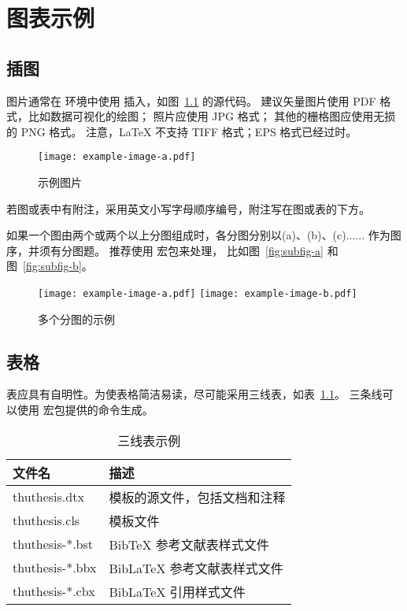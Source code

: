 
\chapter{图表示例}

\section{插图}

图片通常在  环境中使用  插入，如图~\ref{fig:example} 的源代码。
建议矢量图片使用 PDF 格式，比如数据可视化的绘图；
照片应使用 JPG 格式；
其他的栅格图应使用无损的 PNG 格式。
注意，LaTeX 不支持 TIFF 格式；EPS 格式已经过时。

\begin{figure}
  \centering
  \texttt{[image: example-image-a.pdf]}
  \caption{示例图片}
  \label{fig:example}
\end{figure}

若图或表中有附注，采用英文小写字母顺序编号，附注写在图或表的下方。

如果一个图由两个或两个以上分图组成时，各分图分别以(a)、(b)、(c)...... 作为图序，并须有分图题。
推荐使用  宏包来处理， 比如图~\ref{fig:subfig-a} 和图~\ref{fig:subfig-b}。

\begin{figure}
  \centering
    {\texttt{[image: example-image-a.pdf]}}
    {\texttt{[image: example-image-b.pdf]}}
  \caption{多个分图的示例}
  \label{fig:multi-image}
\end{figure}



\section{表格}

表应具有自明性。为使表格简洁易读，尽可能采用三线表，如表~\ref{tab:three-line}。
三条线可以使用  宏包提供的命令生成。

\begin{table}
  \centering
  \caption{三线表示例}
  \begin{tabular}{ll}
    \toprule
    文件名          & 描述                         \\
    \midrule
    thuthesis.dtx   & 模板的源文件，包括文档和注释 \\
    thuthesis.cls   & 模板文件                     \\
    thuthesis-*.bst & BibTeX 参考文献表样式文件    \\
    thuthesis-*.bbx & BibLaTeX 参考文献表样式文件  \\
    thuthesis-*.cbx & BibLaTeX 引用样式文件        \\
    \bottomrule
  \end{tabular}
  \label{tab:three-line}
\end{table}

